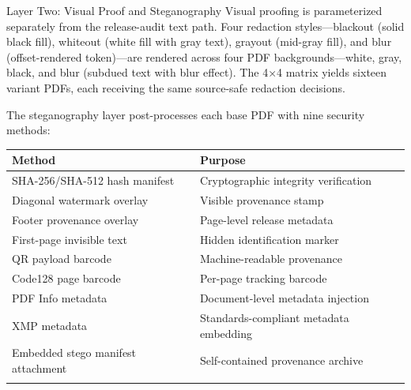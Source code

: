 \documentclass[
  ignorenonframetext,
]{beamer}
\newcounter{none} %
\begin{document}
\begin{frame}[allowframebreaks]{Layer Two: Visual Proof and
Steganography}
\protect{}\label{layer-two-visual-proof-and-steganography}
Visual proofing is parameterized separately from the release-audit text
path. Four redaction styles---blackout (solid black fill), whiteout
(white fill with gray text), grayout (mid-gray fill), and blur
(offset-rendered token)---are rendered across four PDF
backgrounds---white, gray, black, and blur (subdued text with blur
effect). The 4×4 matrix yields sixteen variant PDFs, each receiving the
same source-safe redaction decisions.

The steganography layer post-processes each base PDF with nine security
methods:

{\def\LTcaptype{none} %
\begin{longtable}[]{@{}
  >{\raggedright\arraybackslash}p{}
  >{\raggedright\arraybackslash}p{}@{}}
\toprule\noalign{}
\begin{minipage}[b]{\linewidth}\raggedright
Method
\end{minipage} & \begin{minipage}[b]{\linewidth}\raggedright
Purpose
\end{minipage} \\
\midrule\noalign{}
\endhead
SHA-256/SHA-512 hash manifest & Cryptographic integrity verification \\
Diagonal watermark overlay & Visible provenance stamp \\
Footer provenance overlay & Page-level release metadata \\
First-page invisible text & Hidden identification marker \\
QR payload barcode & Machine-readable provenance \\
Code128 page barcode & Per-page tracking barcode \\
PDF Info metadata & Document-level metadata injection \\
XMP metadata & Standards-compliant metadata embedding \\
Embedded stego manifest attachment & Self-contained provenance
archive \\
\bottomrule\noalign{}
\end{longtable}
}
\end{frame}
\end{document}

